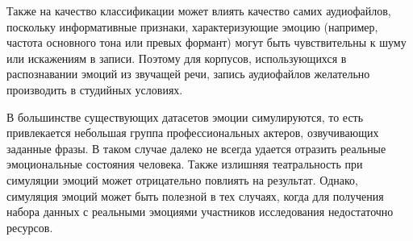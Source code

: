 Также на качество классификации может влиять качество самих аудиофайлов, поскольку информативные признаки, характеризующие эмоцию (например, частота основного тона или превых формант) могут быть чувствительны к шуму или искажениям в записи. Поэтому для корпусов, использующихся в распознавании эмоций из звучащей речи, запись аудиофайлов желательно производить в студийных условиях.

В большинстве существующих датасетов эмоции симулируются, то есть привлекается небольшая группа профессиональных актеров, озвучивающих заданные фразы. В таком случае далеко не всегда удается отразить реальные эмоциональные состояния человека. Также излишняя театральность при симуляции эмоций может отрицательно повлиять на результат. Однако, симуляция эмоций может быть полезной в тех случаях, когда для получения набора данных с реальными эмоциями участников исследования недостаточно ресурсов.

